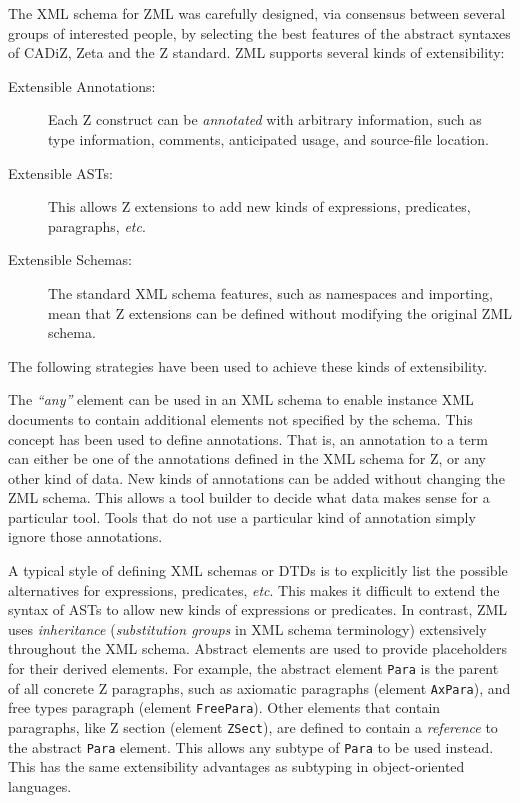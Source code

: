 \documentclass{llncs}
\newcommand{\Element}[1]{\texttt{#1}}
\begin{document}
  The XML schema for ZML was carefully designed, via consensus between
  several groups of interested people, by selecting the best features
  of the abstract syntaxes of CADiZ, Zeta and the Z standard.
  ZML supports several kinds of extensibility:
  \begin{description}
  \item[Extensible Annotations:] Each Z construct can be \emph{annotated}
    with arbitrary information, such as type information, comments,
    anticipated usage, and source-file location.
  \item[Extensible ASTs:] This allows Z extensions to add new kinds
    of expressions, predicates, paragraphs, \textit{etc}.
  \item[Extensible Schemas:] The standard XML schema features, such as
    name\-spa\-ces and importing, mean that Z extensions can be defined without
    modifying the original ZML schema.
  \end{description}
  The following strategies have been used to achieve these kinds
  of extensibility.

  The \textit{``any''} element can be used in an XML schema to enable
  instance XML documents to contain additional elements not specified
  by the schema.  This concept has been used to define annotations.
  That is, an annotation to a term can either be one of the
  annotations defined in the XML schema for Z, or any other kind of
  data.  New kinds of annotations can be added without changing the ZML
  schema.  This allows a tool builder to decide what data makes sense
  for a particular tool.  Tools that do not use a particular kind
  of annotation simply ignore those annotations.

  A typical style of defining XML schemas or DTDs is to explicitly
  list the possible alternatives for expressions, predicates, \textit{etc}.
  This makes it difficult to extend the syntax of ASTs to allow new
  kinds of expressions or
  predicates.  In contrast, ZML uses \emph{inheritance}
  (\emph{substitution groups} in XML schema terminology) extensively
  throughout the XML schema.  Abstract elements are used to provide
  placeholders for their derived elements.  For example, the abstract
  element \Element{Para} is the parent of all concrete Z paragraphs,
  such as axiomatic paragraphs (element \Element{AxPara}), and free
  types paragraph (element \Element{FreePara}).  Other elements that
  contain paragraphs, like Z section (element \Element{ZSect}), are
  defined to contain a \emph{reference} to the abstract \Element{Para}
  element.  This allows any subtype of \Element{Para} to be used
  instead.  This has the same extensibility advantages as subtyping
  in object-oriented languages.
\end{document}
